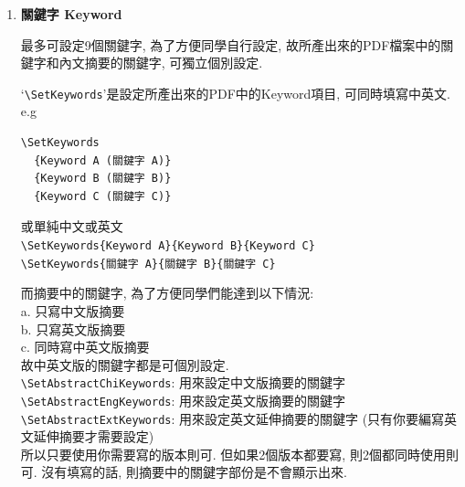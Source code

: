 \begin{enumerate}
{    如果要用的是範例:\\
    \verb|\DisplayOralTemplate|: 顯示 / 使用 口試範例版本.\\
    \verb|\DisplayOralChiTemplate|: 顯示中文範例版本\\
    \verb|\DisplayOralEngTemplate|: 顯示英文範例版本\\
    \verb|\SetCommitteeSize{9}|: 口試委員數量, 要配合\verb|\DisplayOralTemplate|來使用；請先選擇學位。NCKU碩士為3至5位，博士為5至9位，超出範圍會收斂到最近的有效值，預設為9位.\\

    而如果要用的是自己的檔案:\\
    把你的圖片放在`context/oral'下, 之後設定中英文版所對應是哪一個檔案.\\
    就算已啟用`\verb|\DisplayOralImage|', 但沒有填寫圖檔檔名的話, 都不會顯示出來.\\
    (例子用的`example-oral-chi.pdf'和`example-oral-eng.pdf'已放在`context/oral'中)\\
    \verb|\DisplayOralImage|: 設定要顯示圖片\\
    \verb|\SetOralImageChi{example-oral-chi.pdf}|: 設定中文版檔名\\
    \verb|\SetOralImageEng{example-oral-eng.pdf}|: 設定英文版檔名

    雖然沒有限定圖片的格式, 但是推薦使用PDF, 而且是沒法使用SVG.
  } %

  \item
  {
    \textbf{關鍵字 Keyword}

    最多可設定9個關鍵字, 為了方便同學自行設定, 故所產出來的PDF檔案中的關鍵字和內文摘要的關鍵字, 可獨立個別設定.

    `\verb|\SetKeywords|'是設定所產出來的PDF中的Keyword項目, 可同時填寫中英文.
    e.g
    \begin{verbatim}
\SetKeywords
  {Keyword A (關鍵字 A)}
  {Keyword B (關鍵字 B)}
  {Keyword C (關鍵字 C)}
    \end{verbatim}
    或單純中文或英文\\
    \verb|\SetKeywords{Keyword A}{Keyword B}{Keyword C}|\\
    \verb|\SetKeywords{關鍵字 A}{關鍵字 B}{關鍵字 C}|

    而摘要中的關鍵字, 為了方便同學們能達到以下情況:\\
    a. 只寫中文版摘要\\
    b. 只寫英文版摘要\\
    c. 同時寫中英文版摘要\\
    故中英文版的關鍵字都是可個別設定.\\
    \verb|\SetAbstractChiKeywords|: 用來設定中文版摘要的關鍵字\\
    \verb|\SetAbstractEngKeywords|: 用來設定英文版摘要的關鍵字\\
    \verb|\SetAbstractExtKeywords|: 用來設定英文延伸摘要的關鍵字 (只有你要編寫英文延伸摘要才需要設定)\\
    所以只要使用你需要寫的版本則可. 但如果2個版本都要寫, 則2個都同時使用則可. 沒有填寫的話, 則摘要中的關鍵字部份是不會顯示出來.

}
\end{enumerate}
